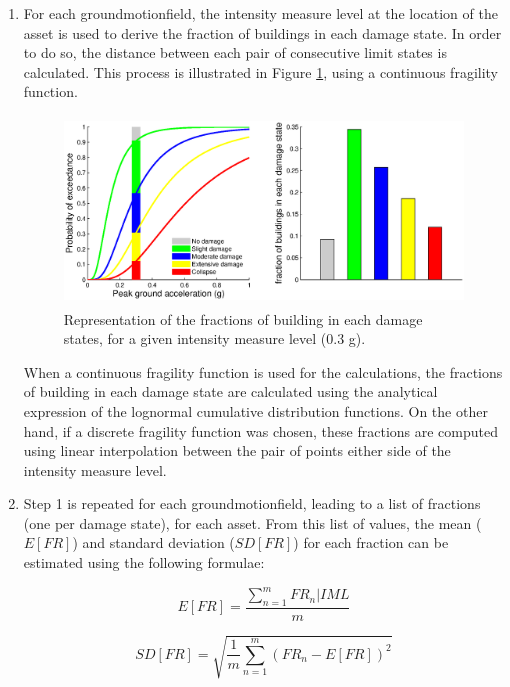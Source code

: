 \begin{enumerate}
\item For each \gls{groundmotionfield}, the intensity measure level at the location of the \gls{asset} is used to derive the
fraction of buildings in each damage state. In order to do so, the distance between each pair of consecutive limit states is calculated. This process is illustrated in Figure \ref{fig:FragilityProcess}, using a continuous \gls{fragility function}.

\begin{figure}[ht]
\centering
\includegraphics[width=14cm,height=5cm]{./figures/risk/Fragility_process.eps}
\caption{Representation of the fractions of building in each damage states, for a given intensity measure level (0.3 g).}
\label{fig:FragilityProcess}
\end{figure}

When a continuous \gls{fragility function} is used for the calculations, the fractions of building in each damage state are calculated using the analytical expression of the lognormal cumulative distribution functions. On the other hand, if a discrete \gls{fragility function} was chosen, these fractions are computed using linear interpolation between the pair of points either side of the intensity measure level.

\item Step 1 is repeated for each \gls{groundmotionfield}, leading to a list of fractions (one per damage state), for each \gls{asset}. From this list of values, the mean ($E[FR]$) and standard deviation ($SD[FR]$) for each fraction can be estimated using the following formulae:

\begin{equation}
E[FR]=\frac{\sum^m_{n=1}FR_n|IML}{m}
\end{equation}

\begin{equation}
SD[FR]=\sqrt{  \frac{1}{m}\sum_{n=1}^m{(FR_n-E[FR])^2} }
\end{equation}
 

\end{enumerate}
